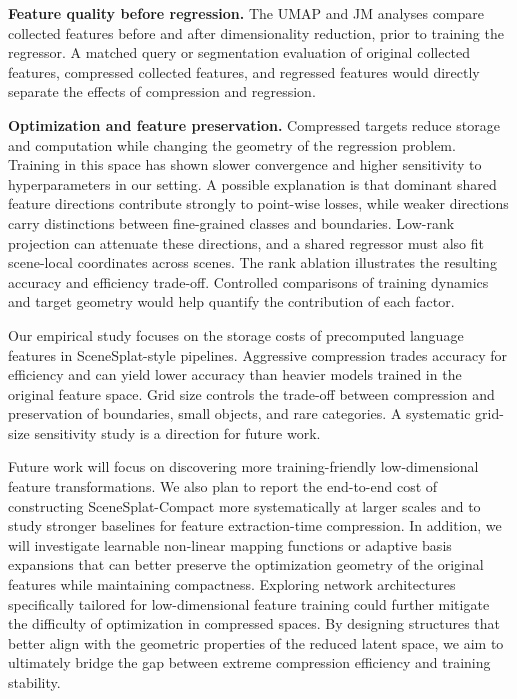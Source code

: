 \noindent\textbf{Feature quality before regression.} The UMAP and JM analyses compare collected features before and after dimensionality reduction, prior to training the regressor. A matched query or segmentation evaluation of original collected features, compressed collected features, and regressed features would directly separate the effects of compression and regression.

\noindent\textbf{Optimization and feature preservation.} Compressed targets reduce storage and computation while changing the geometry of the regression problem. Training in this space has shown slower convergence and higher sensitivity to hyperparameters in our setting. A possible explanation is that dominant shared feature directions contribute strongly to point-wise losses, while weaker directions carry distinctions between fine-grained classes and boundaries. Low-rank projection can attenuate these directions, and a shared regressor must also fit scene-local coordinates across scenes. The rank ablation illustrates the resulting accuracy and efficiency trade-off. Controlled comparisons of training dynamics and target geometry would help quantify the contribution of each factor.

Our empirical study focuses on the storage costs of precomputed language features in SceneSplat-style pipelines. Aggressive compression trades accuracy for efficiency and can yield lower accuracy than heavier models trained in the original feature space. Grid size controls the trade-off between compression and preservation of boundaries, small objects, and rare categories. A systematic grid-size sensitivity study is a direction for future work.

Future work will focus on discovering more training-friendly low-dimensional feature transformations. We also plan to report the end-to-end cost of constructing SceneSplat-Compact more systematically at larger scales and to study stronger baselines for feature extraction-time compression. In addition, we will investigate learnable non-linear mapping functions or adaptive basis expansions that can better preserve the optimization geometry of the original features while maintaining compactness. Exploring network architectures specifically tailored for low-dimensional feature training could further mitigate the difficulty of optimization in compressed spaces. By designing structures that better align with the geometric properties of the reduced latent space, we aim to ultimately bridge the gap between extreme compression efficiency and training stability.

